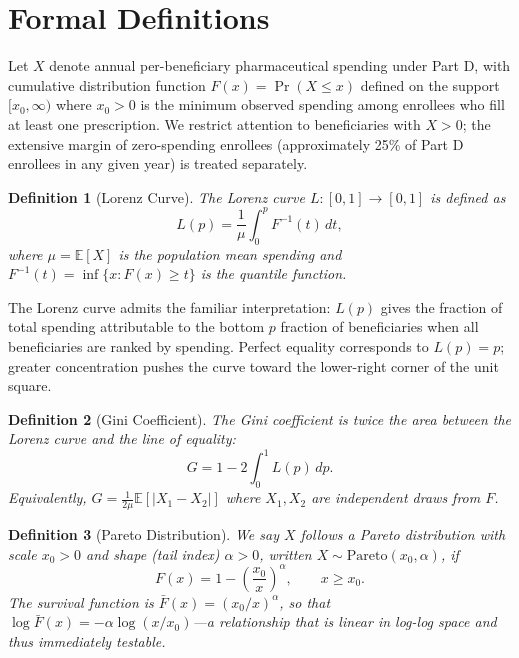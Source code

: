 \documentclass[12pt,letterpaper]{article}
\newtheorem{definition}{Definition}
\begin{document}
\section{Formal Definitions}\label{sec:defs}

Let $X$ denote annual per-beneficiary pharmaceutical spending under Part D,
with cumulative distribution function $F(x) = \Pr(X \le x)$ defined on the
support $[x_0, \infty)$ where $x_0 > 0$ is the minimum observed spending
among enrollees who fill at least one prescription. We restrict attention to
beneficiaries with $X > 0$; the extensive margin of zero-spending enrollees
(approximately 25\% of Part D enrollees in any given year) is treated
separately.

\begin{definition}[Lorenz Curve]
The Lorenz curve $L: [0,1] \to [0,1]$ is defined as
\begin{equation}\label{eq:lorenz}
  L(p) = \frac{1}{\mu} \int_0^{p} F^{-1}(t)\, dt,
\end{equation}
where $\mu = \mathbb{E}[X]$ is the population mean spending and
$F^{-1}(t) = \inf\{x : F(x) \ge t\}$ is the quantile function.
\end{definition}

The Lorenz curve admits the familiar interpretation: $L(p)$ gives the
fraction of total spending attributable to the bottom $p$ fraction of
beneficiaries when all beneficiaries are ranked by spending. Perfect equality
corresponds to $L(p) = p$; greater concentration pushes the curve toward the
lower-right corner of the unit square.

\begin{definition}[Gini Coefficient]
The Gini coefficient is twice the area between the Lorenz curve and the
line of equality:
\begin{equation}\label{eq:gini}
  G = 1 - 2\int_0^1 L(p)\, dp.
\end{equation}
Equivalently, $G = \frac{1}{2\mu}\mathbb{E}[|X_1 - X_2|]$ where $X_1, X_2$
are independent draws from $F$.
\end{definition}

\begin{definition}[Pareto Distribution]
We say $X$ follows a Pareto distribution with scale $x_0 > 0$ and shape
(tail index) $\alpha > 0$, written $X \sim \mathrm{Pareto}(x_0, \alpha)$, if
\begin{equation}\label{eq:pareto_cdf}
  F(x) = 1 - \left(\frac{x_0}{x}\right)^{\alpha}, \qquad x \ge x_0.
\end{equation}
The survival function is $\bar{F}(x) = (x_0/x)^{\alpha}$, so that $\log
\bar{F}(x) = -\alpha \log(x/x_0)$---a relationship that is linear in
log-log space and thus immediately testable.
\end{definition}
\end{document}
